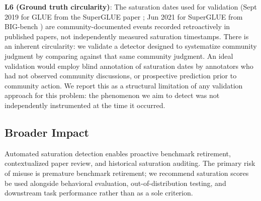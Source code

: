 \textbf{L6 (Ground truth circularity)}: The saturation dates used for validation (Sept 2019 for GLUE from the SuperGLUE paper \citep{wang2019superglue}; Jun 2021 for SuperGLUE from BIG-bench \citep{srivastava2022bigbench}) are community-documented events recorded retroactively in published papers, not independently measured saturation timestamps.
There is an inherent circularity: we validate a detector designed to systematize community judgment by comparing against that same community judgment.
An ideal validation would employ blind annotation of saturation dates by annotators who had not observed community discussions, or prospective prediction prior to community action.
We report this as a structural limitation of any validation approach for this problem: the phenomenon we aim to detect was not independently instrumented at the time it occurred.

\subsection{Broader Impact}

Automated saturation detection enables proactive benchmark retirement, contextualized paper review, and historical saturation auditing.
The primary risk of misuse is premature benchmark retirement; we recommend saturation scores be used alongside behavioral evaluation, out-of-distribution testing, and downstream task performance rather than as a sole criterion.

